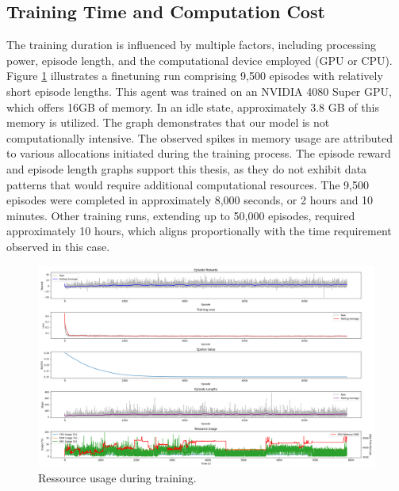 \documentclass{article} %
\begin{document}
	\subsection{Training Time and Computation Cost}
	The training duration is influenced by multiple factors, including processing power, episode length, and the computational device employed (GPU or CPU). Figure \ref{fig:4} illustrates a finetuning run comprising 9,500 episodes with relatively short episode lengths. This agent was trained on an NVIDIA 4080 Super GPU, which offers 16GB of memory. In an idle state, approximately 3.8 GB of this memory is utilized. The graph demonstrates that our model is not computationally intensive. The observed spikes in memory usage are attributed to various allocations initiated during the training process. The episode reward and episode length graphs support this thesis, as they do not exhibit data patterns that would require additional computational resources. The 9,500 episodes were completed in approximately 8,000 seconds, or 2 hours and 10 minutes. Other training runs, extending up to 50,000 episodes, required approximately 10 hours, which aligns proportionally with the time requirement observed in this case.
	\begin{figure}[h!]
		\centering
		\includegraphics[width=1.3\textwidth]{images/gpu_usage}
		\caption{Ressource usage during training.}
		\label{fig:4}
	\end{figure}
	
	\newpage
	
\end{document}
